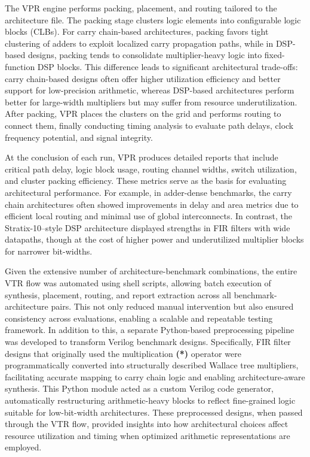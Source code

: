 The VPR engine performs packing, placement, and routing tailored to the architecture file. The packing stage clusters logic elements into configurable logic blocks (CLBs). For carry chain-based architectures, packing favors tight clustering of adders to exploit localized carry propagation paths, while in DSP-based designs, packing tends to consolidate multiplier-heavy logic into fixed-function DSP blocks. This difference leads to significant architectural trade-offs: carry chain-based designs often offer higher utilization efficiency and better support for low-precision arithmetic, whereas DSP-based architectures perform better for large-width multipliers but may suffer from resource underutilization. After packing, VPR places the clusters on the grid and performs routing to connect them, finally conducting timing analysis to evaluate path delays, clock frequency potential, and signal integrity.

At the conclusion of each run, VPR produces detailed reports that include critical path delay, logic block usage, routing channel widths, switch utilization, and cluster packing efficiency. These metrics serve as the basis for evaluating architectural performance. For example, in adder-dense benchmarks, the carry chain architectures often showed improvements in delay and area metrics due to efficient local routing and minimal use of global interconnects. In contrast, the Stratix-10–style DSP architecture displayed strengths in FIR filters with wide datapaths, though at the cost of higher power and underutilized multiplier blocks for narrower bit-widths.

Given the extensive number of architecture-benchmark combinations, the entire VTR flow was automated using shell scripts, allowing batch execution of synthesis, placement, routing, and report extraction across all benchmark-architecture pairs. This not only reduced manual intervention but also ensured consistency across evaluations, enabling a scalable and repeatable testing framework. In addition to this, a separate Python-based preprocessing pipeline was developed to transform Verilog benchmark designs. Specifically, FIR filter designs that originally used the multiplication \textbf{(*)} operator were programmatically converted into structurally described Wallace tree multipliers, facilitating accurate mapping to carry chain logic and enabling architecture-aware synthesis. This Python module acted as a custom Verilog code generator, automatically restructuring arithmetic-heavy blocks to reflect fine-grained logic suitable for low-bit-width architectures. These preprocessed designs, when passed through the VTR flow, provided insights into how architectural choices affect resource utilization and timing when optimized arithmetic representations are employed.

